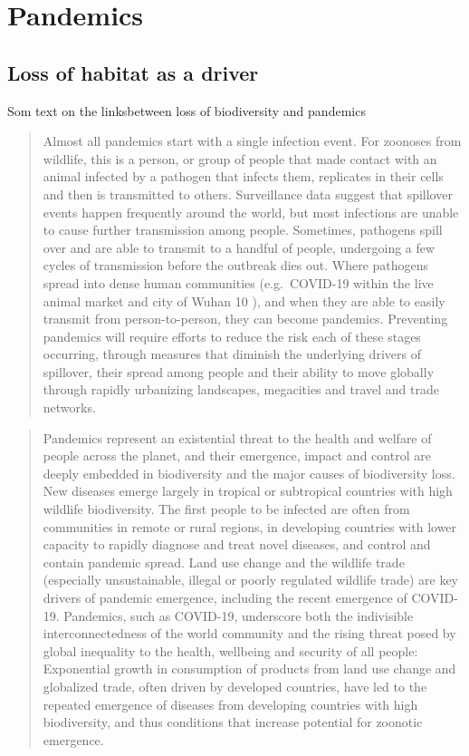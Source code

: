 \documentclass[
]{book}
\begin{document}
\hypertarget{pandemics}{%
\chapter{Pandemics}\label{pandemics}}

\hypertarget{loss-of-habitat-as-a-driver}{%
\section{Loss of habitat as a driver}\label{loss-of-habitat-as-a-driver}}

Som text on the linksbetween loss of biodiversity and pandemics

\begin{quote}
Almost all pandemics start with a single infection event. For zoonoses from wildlife, this is a person, or group of people that made contact with an animal infected by a pathogen that infects them, replicates in their cells and then is transmitted to others. Surveillance data suggest that spillover events happen frequently around the world, but most infections are unable to cause further transmission among people. Sometimes, pathogens spill over and are able to transmit to a handful of people, undergoing a few cycles of transmission before the outbreak dies out. Where pathogens spread into dense human communities (e.g.~COVID-19 within the live animal market and city of Wuhan 10 ), and when they are able to easily transmit from person-to-person, they can become pandemics. Preventing pandemics will require efforts to reduce the risk each of these stages occurring, through measures that diminish the underlying drivers of spillover, their spread among people and their ability to move globally through rapidly urbanizing landscapes, megacities and travel and trade networks.
\end{quote}

\begin{quote}
Pandemics represent an existential threat to the health and welfare of people across the planet, and their emergence, impact and control are deeply embedded in biodiversity and the major causes of biodiversity loss. New diseases emerge largely in tropical or subtropical countries with high wildlife biodiversity. The first people to be infected are often from communities in remote or rural regions, in developing countries with lower capacity to rapidly diagnose and treat novel diseases, and control and contain pandemic spread. Land use change and the wildlife trade (especially unsustainable, illegal or poorly regulated wildlife trade) are key drivers of pandemic emergence, including the recent emergence of COVID-19. Pandemics, such as COVID-19, underscore both the indivisible interconnectedness of the world community and the rising threat posed by global inequality to the health, wellbeing and security of all people: Exponential growth in consumption of products from land use change and globalized trade, often driven by developed countries, have led to the repeated emergence of diseases from developing countries with high biodiversity, and thus conditions that increase potential for zoonotic emergence.
\end{quote}
\end{document}
